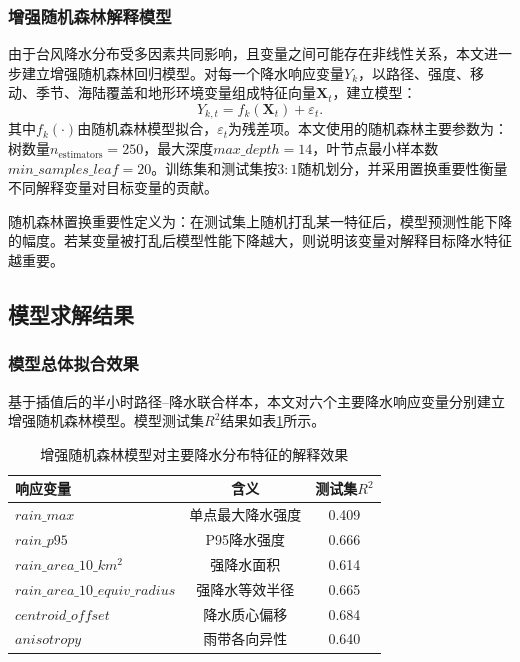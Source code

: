 \documentclass[UTF8,a4paper,zihao=5,fontset=fandol]{ctexart}
\numberwithin{equation}{section}
\numberwithin{figure}{section}
\numberwithin{table}{section}
\begin{document}
\subsubsection{增强随机森林解释模型}

由于台风降水分布受多因素共同影响，且变量之间可能存在非线性关系，本文进一步建立增强随机森林回归模型。对每一个降水响应变量$Y_k$，以路径、强度、移动、季节、海陆覆盖和地形环境变量组成特征向量$\mathbf{X}_t$，建立模型：
\begin{equation}
    Y_{k,t}=f_k(\mathbf{X}_t)+\varepsilon_t.
\end{equation}
其中$f_k(\cdot)$由随机森林模型拟合，$\varepsilon_t$为残差项。本文使用的随机森林主要参数为：树数量$n_{\mathrm{estimators}}=250$，最大深度$max\_depth=14$，叶节点最小样本数$min\_samples\_leaf=20$。训练集和测试集按$3:1$随机划分，并采用置换重要性衡量不同解释变量对目标变量的贡献。

随机森林置换重要性定义为：在测试集上随机打乱某一特征后，模型预测性能下降的幅度。若某变量被打乱后模型性能下降越大，则说明该变量对解释目标降水特征越重要。

\subsection{模型求解结果}

\subsubsection{模型总体拟合效果}

基于插值后的半小时路径--降水联合样本，本文对六个主要降水响应变量分别建立增强随机森林模型。模型测试集$R^2$结果如表\ref{tab:rf_r2_problem1}所示。

\begin{table}[htbp]
    \centering
    \caption{增强随机森林模型对主要降水分布特征的解释效果}
    \label{tab:rf_r2_problem1}
    \begin{tabular}{lcc}
        \hline
        响应变量 & 含义 & 测试集$R^2$ \\
        \hline
        $rain\_max$ & 单点最大降水强度 & 0.409 \\
        $rain\_p95$ & P95降水强度 & 0.666 \\
        $rain\_area\_10\_km^2$ & 强降水面积 & 0.614 \\
        $rain\_area\_10\_equiv\_radius$ & 强降水等效半径 & 0.665 \\
        $centroid\_offset$ & 降水质心偏移 & 0.684 \\
        $anisotropy$ & 雨带各向异性 & 0.640 \\
        \hline
    \end{tabular}
\end{table}
\end{document}
